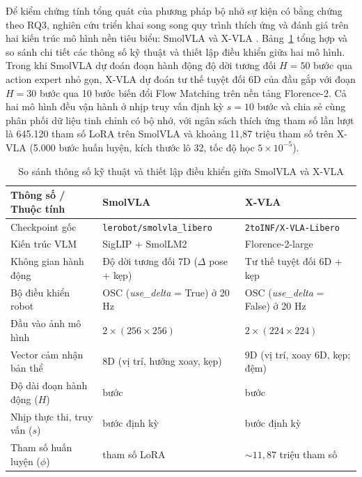 \label{sec:xvla-setup}

Để kiểm chứng tính tổng quát của phương pháp bộ nhớ sự kiện có bằng chứng theo RQ3, nghiên cứu triển khai song song quy trình thích ứng và đánh giá trên hai kiến trúc mô hình nền tiêu biểu: SmolVLA \cite{smolvla2025} và X-VLA \cite{xvla2025}. Bảng~\ref{tab:model-comparison} tổng hợp và so sánh chi tiết các thông số kỹ thuật và thiết lập điều khiển giữa hai mô hình. Trong khi SmolVLA dự đoán đoạn hành động độ dời tương đối $H = 50$ bước qua action expert nhỏ gọn, X-VLA dự đoán tư thế tuyệt đối 6D của đầu gắp với đoạn $H = 30$ bước qua 10 bước biến đổi Flow Matching trên nền tảng Florence-2. Cả hai mô hình đều vận hành ở nhịp truy vấn định kỳ $s = 10$ bước và chia sẻ cùng phân phối dữ liệu tinh chỉnh có bộ nhớ, với ngân sách thích ứng tham số lần lượt là 645.120 tham số LoRA trên SmolVLA và khoảng 11,87 triệu tham số trên X-VLA (5.000 bước huấn luyện, kích thước lô 32, tốc độ học $5\times10^{-5}$).

\begin{table}[htbp]
\centering\small
\caption{So sánh thông số kỹ thuật và thiết lập điều khiển giữa SmolVLA và X-VLA}
\label{tab:model-comparison}
\setlength{\tabcolsep}{4pt}
\begin{tabular}{>{\raggedright\arraybackslash}p{}|>{\raggedright\arraybackslash}p{}|>{\raggedright\arraybackslash}p{}}
\toprule
\textbf{Thông số / Thuộc tính} & \textbf{SmolVLA} & \textbf{X-VLA} \\
\midrule
Checkpoint gốc & \texttt{lerobot/smolvla\_libero} & \texttt{2toINF/X-VLA-Libero} \\
Kiến trúc VLM & SigLIP + SmolLM2 & Florence-2-large \\
Không gian hành động & Độ dời tương đối 7D ($\Delta$ pose + kẹp) & Tư thế tuyệt đối 6D + kẹp \\
Bộ điều khiển robot & OSC (\textit{use\_delta} = True) ở 20 Hz & OSC (\textit{use\_delta} = False) ở 20 Hz \\
Đầu vào ảnh mô hình & $2 \times (256 \times 256)$ & $2 \times (224 \times 224)$ \\
Vector cảm nhận bản thể & 8D (vị trí, hướng xoay, kẹp) & 9D (vị trí, xoay 6D, kẹp; đệm) \\
Độ dài đoạn hành động ($H$) & 50 bước & 30 bước \\
Nhịp thực thi, truy vấn ($s$) & 10 bước định kỳ & 10 bước định kỳ \\
Tham số huấn luyện ($\phi$) & 645.120 tham số LoRA & $\sim 11{,}87$ triệu tham số \\
\bottomrule
\end{tabular}
\end{table}

